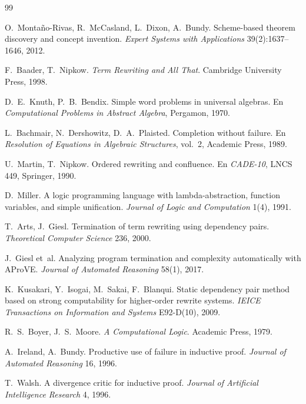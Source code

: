 \documentclass[11pt,a4paper]{article}
\theoremstyle{definition}
\theoremstyle{remark}
\begin{document}
\begin{thebibliography}{99}

O.~Montaño-Rivas, R.~McCasland, L.~Dixon, A.~Bundy.
\newblock Scheme-based theorem discovery and concept invention.
\newblock \emph{Expert Systems with Applications} 39(2):1637--1646, 2012.

F.~Baader, T.~Nipkow.
\newblock \emph{Term Rewriting and All That}.
\newblock Cambridge University Press, 1998.

D.~E.~Knuth, P.~B.~Bendix.
\newblock Simple word problems in universal algebras.
\newblock En \emph{Computational Problems in Abstract Algebra}, Pergamon, 1970.

L.~Bachmair, N.~Dershowitz, D.~A.~Plaisted.
\newblock Completion without failure.
\newblock En \emph{Resolution of Equations in Algebraic Structures}, vol.~2,
  Academic Press, 1989.

U.~Martin, T.~Nipkow.
\newblock Ordered rewriting and confluence.
\newblock En \emph{CADE-10}, LNCS 449, Springer, 1990.

D.~Miller.
\newblock A logic programming language with lambda-abstraction, function
  variables, and simple unification.
\newblock \emph{Journal of Logic and Computation} 1(4), 1991.

T.~Arts, J.~Giesl.
\newblock Termination of term rewriting using dependency pairs.
\newblock \emph{Theoretical Computer Science} 236, 2000.

J.~Giesl et~al.
\newblock Analyzing program termination and complexity automatically with AProVE.
\newblock \emph{Journal of Automated Reasoning} 58(1), 2017.

K.~Kusakari, Y.~Isogai, M.~Sakai, F.~Blanqui.
\newblock Static dependency pair method based on strong computability for
  higher-order rewrite systems.
\newblock \emph{IEICE Transactions on Information and Systems} E92-D(10), 2009.

R.~S.~Boyer, J.~S.~Moore.
\newblock \emph{A Computational Logic}.
\newblock Academic Press, 1979.

A.~Ireland, A.~Bundy.
\newblock Productive use of failure in inductive proof.
\newblock \emph{Journal of Automated Reasoning} 16, 1996.

T.~Walsh.
\newblock A divergence critic for inductive proof.
\newblock \emph{Journal of Artificial Intelligence Research} 4, 1996.


\end{thebibliography}
\end{document}
